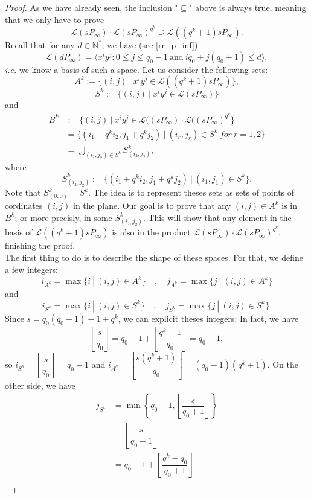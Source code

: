 \documentclass[a4paper]{article}
\newcommand{\calL}{\mathcal{L}}
\begin{document}
\begin{proof}
As we have already seen, the inclusion "$\subseteq$" above is always true, meaning that we only have to prove 
\[\calL(sP_{\infty}) \cdot \calL(sP_{\infty})^{q^k} \supseteq \calL((q^k+1)sP_{\infty}).\]
Recall that for any $d \in \mathbb{N}^*$, we have (see \eqref{rr_p_inf})
\[\calL(dP_{\infty}) = \langle x^iy^j : 0 \leq j \leq q_0-1 \ \mathrm{and} \ iq_0+j(q_0+1) \leq d \rangle, \]
\emph{i.e.} we know a basis of such a space. Let us consider the following sets:
\[A^k := \{(i,j) \ | \ x^iy^j \in \calL((q^k+1)sP_{\infty})\},\]
\[S^k := \{(i,j) \ | \ x^iy^j \in \calL(sP_{\infty})\}\]
and
\begin{align*}
B^k &:= \{(i,j) \ | \ x^iy^j \in \calL((sP_{\infty}) \cdot \calL((sP_{\infty})^{q^k} \} \\
&= \{(i_1+q^ki_2,j_1+q^kj_2) \ | \ (i_r,j_r) \in S^k \ for \ r=1,2\} \\
&= \bigcup_{(i_2,j_2)\in S^k} S^k_{(i_2,j_2)},
\end{align*}
where 
\[ S^k_{(i_2,j_2)} := \{(i_1+q^ki_2,j_1+q^kj_2) \ | \ (i_1,j_1) \in S^k\}.\]
Note that $S^k_{(0,0)}=S^k$. The idea is to represent theses sets as sets of points of cordinates $(i,j)$ in the plane. Our goal is to prove that any $(i,j) \in A^k$ is in $B^k$; or more precisly, in some $S^k_{(i_2,j_2)}$. This will show that any element in the basis of $\calL((q^k+1)sP_{\infty})$ is also in the product $\calL(sP_{\infty}) \cdot \calL(sP_{\infty})^{q^k}$, finishing the proof. \\
The first thing to do is to describe the shape of these spaces. For that, we define a few integers:
\[i_{A^k} = \max \{ i \ | \ (i,j) \in A^k\} \quad , \quad j_{A^k} = \max \{ j \ | \ (i,j) \in A^k\}\]
and
\[i_{S^k} = \max \{ i \ | \ (i,j) \in S^k\} \quad , \quad j_{S^k} = \max \{ j \ | \ (i,j) \in S^k\}.\]
Since $s=q_0(q_0-1)-1+q^k$, we can explicit theses integers: In fact, we have 
\[ \left\lfloor \dfrac{s}{q_0} \right\rfloor = q_0-1 + \left\lfloor \dfrac{q^k-1}{q_0}\right\rfloor = q_0-1,\]
so $i_{S^k} = \left\lfloor \dfrac{s}{q_0} \right\rfloor = q_0-1$ and $i_{A^k} = \left\lfloor \dfrac{s(q^k+1)}{q_0} \right\rfloor = (q_0-1)(q^k+1)$. On the other side, we have 
\begin{align*}
    j_{S^k} &= \min \left\{ q_0-1, \left\lfloor \dfrac{s}{q_0+1} \right\rfloor \right\} \\
            &=  \left\lfloor \dfrac{s}{q_0+1} \right\rfloor \\
            &= q_0-1 +  \left\lfloor \dfrac{q^k-q_0}{q_0+1} \right\rfloor \\

\end{align*}
\end{proof}
\end{document}

